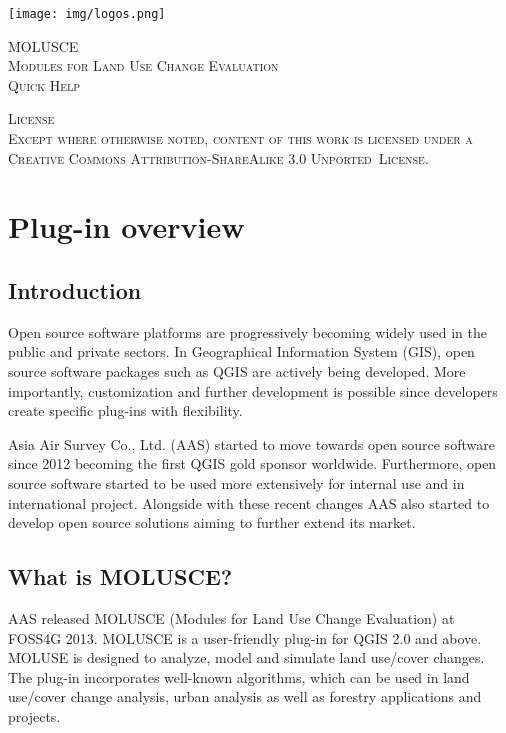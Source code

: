 \documentclass{report}
\begin{document}
\begin{titlepage}


\center %
 
\texttt{[image: img/logos.png]}

\vfill %

\textsc{\LARGE MOLUSCE}\\[1.5cm] 
\textsc{\Large Modules for Land Use Change Evaluation}\\[0.5cm] 
\textsc{\large Quick Help}\\[0.5cm]

\vfill %

 
\textsc{
License\\
Except where otherwise noted, content of this work is licensed under a Creative
Commons Attribution-ShareAlike 3.0 Unported~License.
}

\end{titlepage}


\tableofcontents


\chapter{Plug-in overview}
\section{Introduction}

Open source software platforms are progressively becoming widely used in the public and private
sectors. In Geographical Information System (GIS), open source software packages such as QGIS
are actively being developed. More importantly, customization and further development is possible
since developers create specific plug-ins with flexibility.

Asia Air Survey Co., Ltd. (AAS) started to move towards open source software since 2012
becoming the first QGIS gold sponsor worldwide. Furthermore, open source software started to be
used more extensively for internal use and in international project. Alongside with these recent
changes AAS also started to develop open source solutions aiming to further extend its market.


\section{What is MOLUSCE?}
AAS released MOLUSCE (Modules for Land Use Change Evaluation) at FOSS4G 2013.
MOLUSCE is a user-friendly plug-in for QGIS 2.0 and above. MOLUSE is designed to analyze,
model and simulate land use/cover changes. The plug-in incorporates well-known algorithms,
which can be used in land use/cover change analysis, urban analysis as well as forestry applications
and projects.
\end{document}
